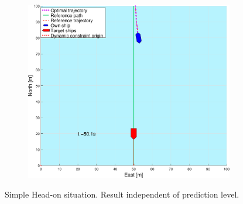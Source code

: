 \begin{figure}[ht!]
\begin{subfigure}[b]{0.49\textwidth}
        \subcaption{}
    \end{subfigure}
    \hfill
    \begin{subfigure}[b]{0.499\textwidth}
        \centering
        \includegraphics[width=\textwidth]{Images/Figures/enkel_HO/_Simple_0fig999_time=50}
        \subcaption{}
    \end{subfigure}
    \hfill
    \caption{Simple Head-on situation. Result independent of prediction level.}
    \label{FIG: Simple HO}
\end{figure}%

